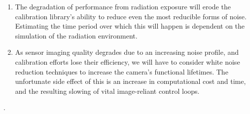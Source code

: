 \documentclass[10pt]{article}
\begin{document}
\begin{enumerate}
    \item The degradation of performance from radiation exposure will erode the calibration library's ability to reduce even the most reducible forms of noise. Estimating the time period over which this will happen is dependent on the simulation of the radiation environment.
    \item As sensor imaging quality degrades due to an increasing noise profile, and calibration efforts lose their efficiency, we will have to consider white noise reduction techniques to increase the camera's functional lifetimes. The unfortunate side effect of this is an increase in computational cost and time, and the resulting slowing of vital image-reliant control loops.
    
\end{enumerate}
    
\newpage


.
\printbibliography[prenote=myprenote]
\end{document}
